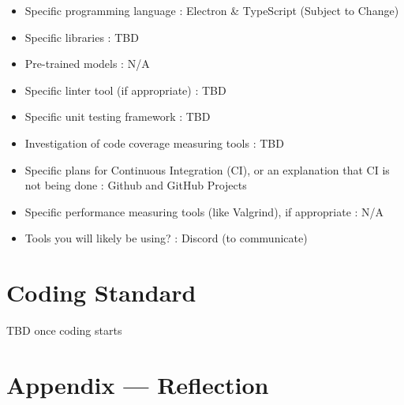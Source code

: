 \documentclass{article}
\begin{document}
\begin{itemize}
\item Specific programming language : Electron \& TypeScript (Subject to Change)
\item Specific libraries : TBD
\item Pre-trained models : N/A
\item Specific linter tool (if appropriate) : TBD
\item Specific unit testing framework : TBD
\item Investigation of code coverage measuring tools : TBD
\item Specific plans for Continuous Integration (CI), or an explanation that CI
  is not being done : Github and GitHub Projects
\item Specific performance measuring tools (like Valgrind), if
  appropriate : N/A
\item Tools you will likely be using? : Discord (to communicate)
\end{itemize}


\section{Coding Standard}


TBD once coding starts 

\newpage{}

\section*{Appendix --- Reflection}



\end{document}
